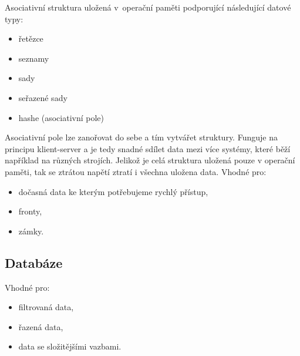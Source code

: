 Asociativní struktura uložená v~operační paměti podporující následující datové typy:

\begin{itemize}
	\item řetězce
	\item seznamy
	\item sady
	\item seřazené sady
	\item hashe (asociativní pole)
\end{itemize}

Asociativní pole lze zanořovat do sebe a tím vytvářet struktury.
Funguje na principu klient-server a je tedy snadné sdílet data mezi více systémy, které běží například na různých strojích.
Jelikož je celá struktura uložená pouze v operační paměti, tak se ztrátou napětí ztratí i všechna uložena data.
Vhodné pro:

\begin{itemize}
	\item dočasná data ke kterým potřebujeme rychlý přístup,
	\item fronty,
	\item zámky.
\end{itemize}
\cite{redis}

\subsection{Databáze}

Vhodné pro:

\begin{itemize}
	\item filtrovaná data,
	\item řazená data,
	\item data se složitějšími vazbami.
\end{itemize}


